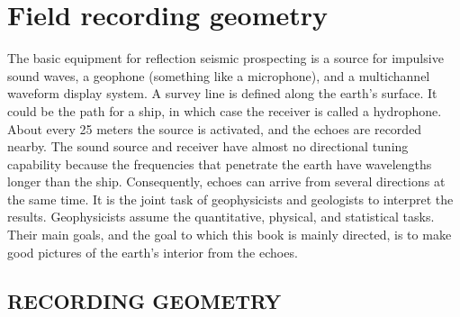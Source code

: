  

\def\CAKEDIR{.}

\chapter{Field recording geometry}
\label{paper:fld}



\par
The basic equipment for reflection seismic prospecting
is a source for impulsive sound waves,
a geophone (something like a microphone),
and a multichannel waveform display system.
A survey line is defined along the earth's surface.
It could be the path for a ship,
in which case the receiver is called a hydrophone.
About every 25 meters the source is activated, and
the echoes are recorded nearby.
The sound source and receiver have almost no directional tuning capability
because the frequencies that penetrate the earth
have wavelengths longer than the ship.
Consequently, echoes can arrive from several directions at the same time.
It is the joint task of geophysicists and geologists
to interpret the results.
Geophysicists assume the quantitative, physical, and statistical tasks.
Their main goals, and the goal to which this
book is mainly directed, is to make good 
pictures of the earth's interior from the echoes.

\section{RECORDING GEOMETRY}

